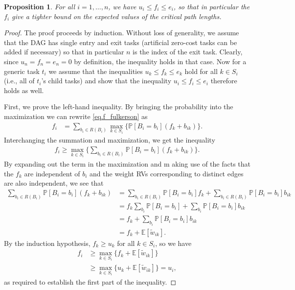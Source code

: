 \documentclass[12pt]{article}
\def\P{\mathbb{P}}
\def\E{\mathbb{E}}
\newtheorem{prop}[theorem]{Proposition}
\begin{document}
\begin{prop}
	\label{prop.fulkerson}
	For all $i = 1, \dots, n$, we have $u_i \leq f_i \leq e_i$, so that in particular the $f_i$ give a tighter bound on the expected values of the critical path lengths.
\end{prop}
\begin{proof}
	The proof proceeds by induction. Without loss of generality, we assume that the DAG has single entry and exit tasks (artificial zero-cost tasks can be added if necessary) so that in particular $n$ is the index of the exit task. Clearly, since $u_n = f_n = e_n = 0$ by definition, the inequality holds in that case. Now for a generic task $t_i$ we assume that the inequalities $u_k \leq f_k \leq e_k$ hold for all $k \in S_i$ (i.e., all of $t_i$'s child tasks) and show that the inequality $u_i \leq f_i \leq e_i$ therefore holds as well. 
	
First, we prove the left-hand inequality. By bringing the probability into the maximization we can rewrite \eqref{eq.f_fulkerson} as    
\begin{align*}
f_i &= \sum_{b_i \in R(B_i)} \max_{k \in S_i} \{ \P[B_i = b_i] (f_k + b_{ik} ) \}.
\end{align*}
Interchanging the summation and maximization, we get the inequality
\begin{align*}
f_i \geq \max_{k \in S_i} \bigg\{ \sum_{b_i \in R(B_i)} \P[B_i = b_i] (f_k + b_{ik} ) \bigg\}.
\end{align*}
By expanding out the term in the maximization and m
aking use of the facts that the $f_k$ are independent of $b_i$ and the weight RVs corresponding to distinct edges are also independent, we see that
\begin{align*}
\sum_{b_i \in R(B_i)} \P[B_i = b_i] (f_k + b_{ik} ) &=  \sum_{b_i \in R(B_i)} \P[B_i = b_i]f_k + \sum_{b_i \in R(B_i)} \P[B_i = b_i] b_{ik} \\
&= f_k \sum_{b_i} \P[B_i = b_i] + \sum_{b_i} \P[B_i = b_i] b_{ik} \\
&= f_k + \sum_{b_i} \P[B_i = b_i] b_{ik} \\
&= f_k + \E[\tilde{w}_{ik}].
\end{align*}
By the induction hypothesis, $f_k \geq u_k$ for all $k \in S_i$, so we have
\begin{align*}
f_i &\geq \max_{k \in S_i} \{ f_k + \E[\tilde{w}_{ik}] \} \\
&\geq \max_{k \in S_i} \{ u_k + \E[\tilde{w}_{ik}] \} = u_i,
\end{align*}
as required to establish the first part of the inequality. 


\end{proof}
\end{document}
